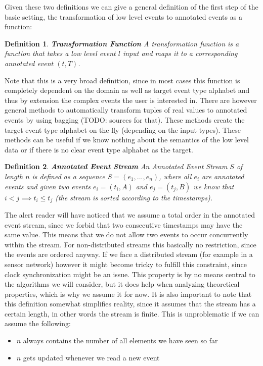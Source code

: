 \documentclass[journal]{IEEEtran}
\newtheorem{mydef}{Definition}
\begin{document}
Given these two definitions we can give a general definition of the first step of the basic setting, the transformation of low level events to annotated events as a function:

\begin{mydef}
\textbf{Transformation Function} A transformation function is a function that takes a low level event $l$ input and maps it to a corresponding annotated event $(t,T)$.
\end{mydef}
Note that this is a very broad definition, since in most cases this function is completely dependent on the domain as well as target event type alphabet and thus by extension the complex events the user is interested in. There are however general methods to automatically transform tuples of real values to annotated events by using bagging (TODO: sources for that). These methods create the target event type alphabet on the fly (depending on the input types). These methods can be useful if we know nothing about the semantics of the low level data or if there is no clear event type alphabet as the target.

\begin{mydef}
\textbf{Annotated Event Stream} An Annotated Event Stream $S$ of length $n$ is defined as a sequence $S=(e_1,...,e_n)$, where all $e_i$ are annotated events and given two events $e_i=(t_i,A)$ and $e_j=(t_j,B)$ we know that $i < j \implies t_i \le t_j$ (the stream is sorted according to the timestamps).
\end{mydef}

The alert reader will have noticed that we assume a total order in the annotated event stream, since we forbid that two consecutive timestamps may have the same value. This means that we do not allow two events to occur concurrently within the stream. For non-distributed streams this basically no restriction, since the events are ordered anyway. If we face a distributed stream (for example in a sensor network) however it might become tricky to fulfill this constraint, since clock synchronization might be an issue. This property is by no means central to the algorithms we will consider, but it does help when analyzing theoretical properties, which is why we assume it for now. \newline
It is also important to note that this definition somewhat simplifies reality, since it assumes that the stream has a certain length, in other words the stream is finite. This is unproblematic if we can assume the following:

\begin{itemize}
	\item $n$ always contains the number of all elements we have seen so far
	\item $n$ gets updated whenever we read a new event
\end{itemize}
\end{document}
